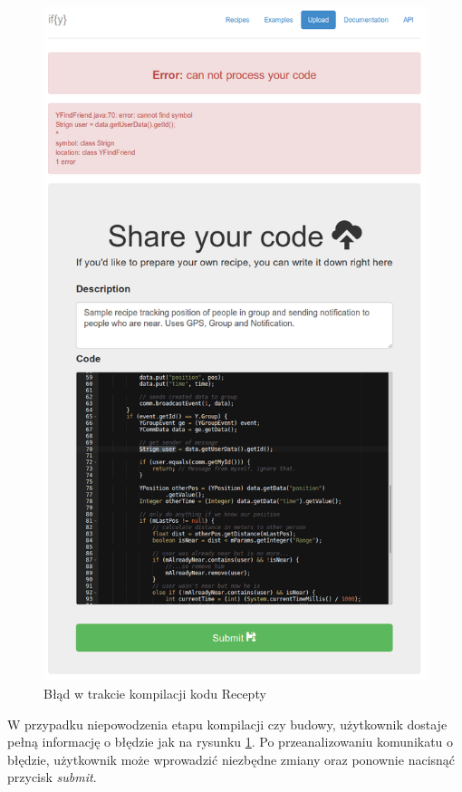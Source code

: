 \documentclass[11pt,a4paper,polish,thesis]{dcsbook}
\begin{document}
\begin{figure}[H]
  \centering
  \includegraphics[scale=0.4]{./resources/market_error.png}
  \caption{Błąd w trakcie kompilacji kodu Recepty}
  \label{fig:market_error}
\end{figure}
W przypadku niepowodzenia etapu kompilacji czy budowy, użytkownik
dostaje pełną informację o błędzie jak na rysunku \ref{fig:market_error}. Po przeanalizowaniu komunikatu o błędzie, użytkownik może wprowadzić niezbędne zmiany oraz
ponownie nacisnąć przycisk \emph{submit}.
\end{document}

